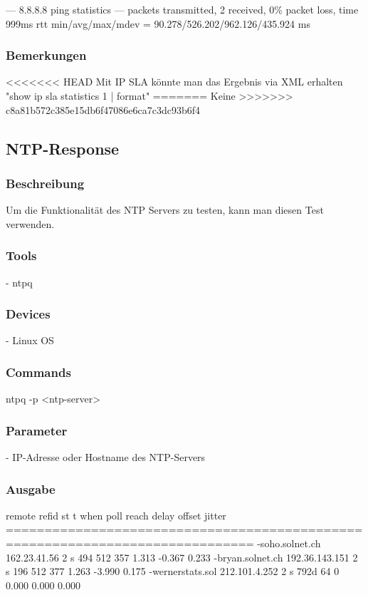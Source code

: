 \documentclass[a4,12pt]{scrartcl}
\begin{document}
--- 8.8.8.8 ping statistics --- packets transmitted, 2 received, 0\% packet loss, time 999ms\newline
rtt min/avg/max/mdev = 90.278/526.202/962.126/435.924 ms\newline

\subsubsection{Bemerkungen}
<<<<<<< HEAD
Mit IP SLA könnte man das Ergebnis via XML erhalten
"show ip sla statistics 1 | format"
=======
Keine
>>>>>>> c8a81b572c385e15db6f47086e6ca7c3dc93b6f4

\subsection{NTP-Response}
\subsubsection{Beschreibung}
Um die Funktionalität des NTP Servers zu testen, kann man diesen Test verwenden.
\subsubsection{Tools}
- ntpq
\subsubsection{Devices}
- Linux OS
\subsubsection{Commands}
ntpq -p <ntp-server>
\subsubsection{Parameter}
- IP-Adresse oder Hostname des NTP-Servers
\subsubsection{Ausgabe}
     remote           refid      st t when poll reach   delay   offset  jitter\newline
==============================================================================\newline
-soho.solnet.ch  162.23.41.56     2 s  494  512  357    1.313   -0.367   0.233\newline
-bryan.solnet.ch 192.36.143.151   2 s  196  512  377    1.263   -3.990   0.175\newline
-wernerstats.sol 212.101.4.252    2 s 792d   64    0    0.000    0.000   0.000\newline
\end{document}
